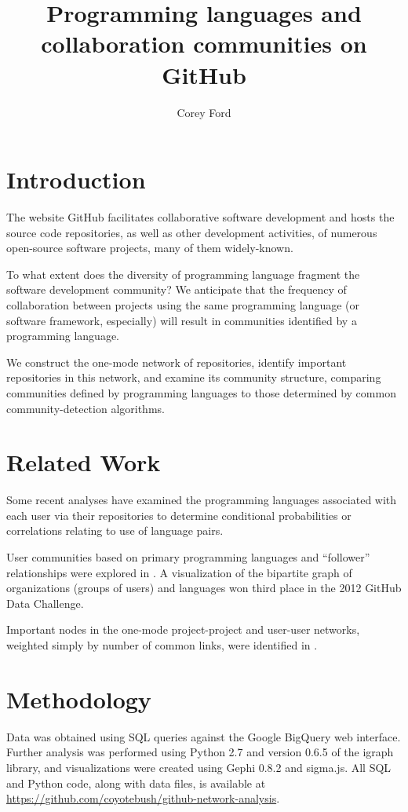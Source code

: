 \documentclass[11pt]{article}
\title{Programming languages and\\collaboration communities on GitHub}
\author{Corey Ford}
\begin{document}
\maketitle

\section{Introduction}

The website GitHub facilitates collaborative software development and hosts the
source code repositories, as well as other development activities, of numerous
open-source software projects, many of them widely-known.

To what extent does the diversity of programming language fragment the software
development community? We anticipate that the frequency of collaboration between
projects using the same programming language (or software framework, especially)
will result in communities identified by a programming language.

We construct the one-mode network of repositories, identify important
repositories in this network, and examine its community structure, comparing
communities defined by programming languages to those determined by common
community-detection algorithms.

\section{Related Work}
Some recent analyses have examined the programming languages associated with
each user via their repositories to determine conditional probabilities
\cite{doll12} or correlations \cite{shah13} relating to use of language pairs.

User communities based on primary programming languages and ``follower''
relationships were explored in \cite{cuny10,weber12}.  A visualization of the
bipartite graph of organizations (groups of users) and languages
\cite{rodrigues12} won third place in the 2012 GitHub Data Challenge.

Important nodes in the one-mode project-project and user-user networks, weighted
simply by number of common links, were identified in \cite{thung2013}.

\section{Methodology}
Data was obtained using SQL queries against the Google BigQuery web interface.
Further analysis was performed using Python 2.7 and version 0.6.5 of the igraph
library, and visualizations were created using Gephi 0.8.2 and sigma.js. All SQL
and Python code, along with data files, is available at
\url{https://github.com/coyotebush/github-network-analysis}.
\end{document}
